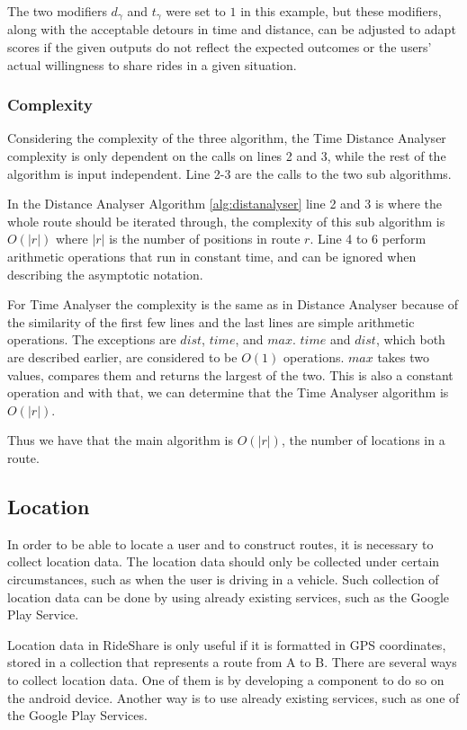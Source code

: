 The two modifiers $d_\gamma$ and $t_\gamma$ were set to $1$ in this example, but these modifiers, along with the acceptable detours in time and distance, can be adjusted to adapt scores if the given outputs do not reflect the expected outcomes or the users' actual willingness to share rides in a given situation. 

\subsubsection{Complexity}
Considering the complexity of the three algorithm, the Time Distance Analyser complexity is only dependent on the calls on lines 2 and 3, while the rest of the algorithm is input independent.
Line 2-3 are the calls to the two sub algorithms.

In the Distance Analyser Algorithm \ref{alg:distanalyser} line 2 and 3 is where the whole route should be iterated through, the complexity of this sub algorithm is $O(|r|)$ where $|r|$ is the number of positions in route $r$.
Line 4 to 6 perform arithmetic operations that run in constant time, and can be ignored when describing the asymptotic notation.

For Time Analyser the complexity is the same as in Distance Analyser because of the similarity of the first few lines and the last lines are simple arithmetic operations. 
The exceptions are $dist$, $time$, and $max$. 
$time$ and $dist$, which both are described earlier, are considered to be $O(1)$ operations.
$max$ takes two values, compares them and returns the largest of the two.
This is also a constant operation and with that, we can determine that the Time Analyser algorithm is $O(|r|)$.

Thus we have that the main algorithm is $O(|r|)$, the number of locations in a route.

\subsection{Location}
In order to be able to locate a user and to construct routes, it is necessary to collect location data. 
The location data should only be collected under certain circumstances, such as when the user is driving in a vehicle. 
Such collection of location data can be done by using already existing services, such as the Google Play Service.

Location data in RideShare is only useful if it is formatted in GPS coordinates, stored in a collection that represents a route from A to B.
There are several ways to collect location data. 
One of them is by developing a component to do so on the android device. 
Another way is to use already existing services, such as one of the Google Play Services.

